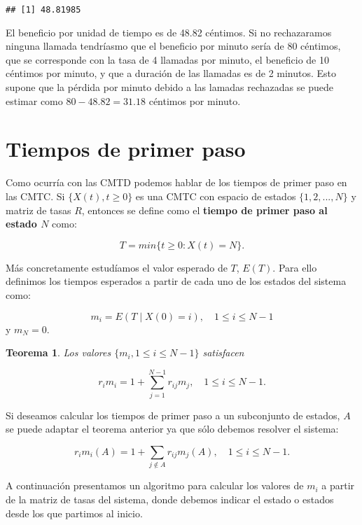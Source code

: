 \documentclass[
]{book}
\newtheorem{theorem}{Teorema}[chapter]
\theoremstyle{definition}
\theoremstyle{definition}
\theoremstyle{definition}
\theoremstyle{definition}
\theoremstyle{remark}
\begin{document}
\begin{verbatim}
## [1] 48.81985
\end{verbatim}

El beneficio por unidad de tiempo es de 48.82 céntimos. Si no rechazaramos ninguna llamada tendríasmo que el beneficio por minuto sería de 80 céntimos, que se corresponde con la tasa de 4 llamadas por minuto, el beneficio de 10 céntimos por minuto, y que a duración de las llamadas es de 2 minutos. Esto supone que la pérdida por minuto debido a las lamadas rechazadas se puede estimar como \(80 - 48.82 = 31.18\) céntimos por minuto.

\hypertarget{CMTCJ}{%
\section{Tiempos de primer paso}\label{CMTCJ}}

Como ocurría con las CMTD podemos hablar de los tiempos de primer paso en las CMTC. Si \(\{X(t), t \geq 0\}\) es una CMTC con espacio de estados \(\{1, 2,...,N\}\) y matriz de tasas \(R\), entonces se define como el \textbf{tiempo de primer paso al estado \(N\)} como:

\[T = min\{t \geq 0: X(t) = N\}.\]

Más concretamente estudíamos el valor esperado de \(T\), \(E(T)\). Para ello definimos los tiempos esperados a partir de cada uno de los estados del sistema como:

\[m_i = E(T \mid X(0) = i), \quad 1 \leq i \leq N-1\]
y \(m_N = 0.\)

\begin{theorem}
Los valores \(\{m_i, 1 \leq i \leq N-1\}\) satisfacen

\[r_im_i = 1 + \sum_{j=1}^{N-1} r_{ij}m_j, \quad 1\leq i \leq N-1.\]
\end{theorem}

Si deseamos calcular los tiempos de primer paso a un subconjunto de estados, \(A\) se puede adaptar el teorema anterior ya que sólo debemos resolver el sistema:

\[r_im_i(A) = 1 + \sum_{j \notin A} r_{ij}m_j(A), \quad 1\leq i \leq N-1.\]

A continuación presentamos un algoritmo para calcular los valores de \(m_i\) a partir de la matriz de tasas del sistema, donde debemos indicar el estado o estados desde los que partimos al inicio.
\end{document}

